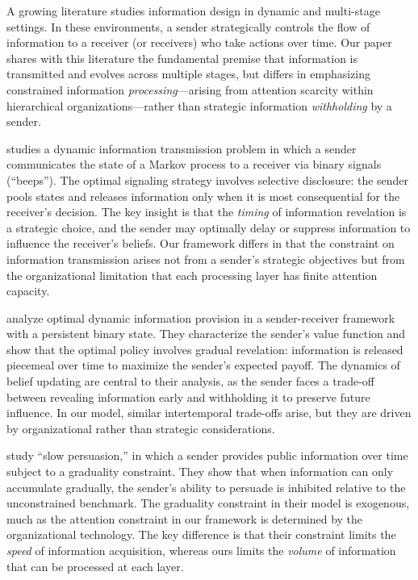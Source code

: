 A growing literature studies information design in dynamic and multi-stage settings. In these environments, a sender strategically controls the flow of information to a receiver (or receivers) who take actions over time. Our paper shares with this literature the fundamental premise that information is transmitted and evolves across multiple stages, but differs in emphasizing constrained information \emph{processing}---arising from attention scarcity within hierarchical organizations---rather than strategic information \emph{withholding} by a sender.

\citet{ely2017beeps} studies a dynamic information transmission problem in which a sender communicates the state of a Markov process to a receiver via binary signals (``beeps''). The optimal signaling strategy involves selective disclosure: the sender pools states and releases information only when it is most consequential for the receiver's decision. The key insight is that the \emph{timing} of information revelation is a strategic choice, and the sender may optimally delay or suppress information to influence the receiver's beliefs. Our framework differs in that the constraint on information transmission arises not from a sender's strategic objectives but from the organizational limitation that each processing layer has finite attention capacity.

\citet{renault2017optimal} analyze optimal dynamic information provision in a sender-receiver framework with a persistent binary state. They characterize the sender's value function and show that the optimal policy involves gradual revelation: information is released piecemeal over time to maximize the sender's expected payoff. The dynamics of belief updating are central to their analysis, as the sender faces a trade-off between revealing information early and withholding it to preserve future influence. In our model, similar intertemporal trade-offs arise, but they are driven by organizational rather than strategic considerations.

\citet{escude2023slow} study ``slow persuasion,'' in which a sender provides public information over time subject to a graduality constraint. They show that when information can only accumulate gradually, the sender's ability to persuade is inhibited relative to the unconstrained benchmark. The graduality constraint in their model is exogenous, much as the attention constraint in our framework is determined by the organizational technology. The key difference is that their constraint limits the \emph{speed} of information acquisition, whereas ours limits the \emph{volume} of information that can be processed at each layer.

